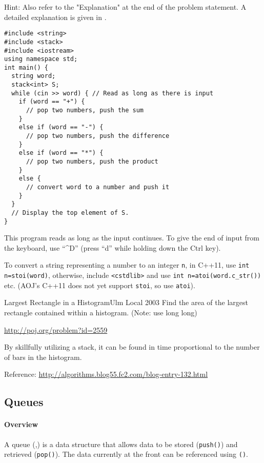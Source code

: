 Hint: Also refer to the "Explanation" at the end of the problem statement.
A detailed explanation is given in \pcaojbook[p.82].

\begin{cbox}[emph={string,stack,top,push}]
\begin{verbatim}
#include <string>
#include <stack>
#include <iostream>
using namespace std;
int main() {
  string word;
  stack<int> S;
  while (cin >> word) { // Read as long as there is input
    if (word == "+") {
      // pop two numbers, push the sum
    }
    else if (word == "-") {
      // pop two numbers, push the difference
    }
    else if (word == "*") {
      // pop two numbers, push the product
    }
    else {
      // convert word to a number and push it
    }
  }
  // Display the top element of S.
}
\end{verbatim}
\end{cbox}

This program reads as long as the input continues. To give the end of input from the keyboard, use ``\textasciicircum{}D'' (press ``d'' while holding down the Ctrl key).

To convert a string representing a number to an integer \texttt{n},
in C++11, use \texttt{int n=stoi(word)},
otherwise, include \texttt{<cstdlib>} and use \texttt{int n=atoi(word.c\_str())} etc. (AOJ's C++11 does not yet support \texttt{stoi}, so use \texttt{atoi}).

\begin{pbox}{Largest Rectangle in a Histogram}{Ulm Local 2003}
  Find the area of the largest rectangle contained within a histogram. (Note: use long long)

\url{http://poj.org/problem?id=2559}
\end{pbox}

By skillfully utilizing a stack, it can be found in time proportional to the number of bars in the histogram.

Reference: \url{http://algorithms.blog55.fc2.com/blog-entry-132.html}
\subsection{Queues}\label{section:queue}
\paragraph{Overview}
A queue (,\pccbook[p.~32]) is a data structure that allows data to be stored (\texttt{push()}) and retrieved (\texttt{pop()}).
The data currently at the front can be referenced using \texttt{()}.

